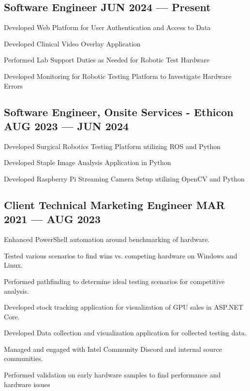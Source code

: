 \subsection{{Software Engineer \hfill JUN 2024 --- Present}}
\begin{zitemize}
\item Developed Web Platform for User Authentication and Access to Data
\item Developed Clinical Video Overlay Application
\item Performed Lab Support Duties as Needed for Robotic Test Hardware
\item Developed Monitoring for Robotic Testing Platform to Investigate Hardware Errors
\end{zitemize}

\subsection{{Software Engineer, Onsite Services - Ethicon \hfill AUG 2023 --- JUN 2024}}
\begin{zitemize}
\item Developed Surgical Robotics Testing Platform utilizing ROS and Python
\item Developed Staple Image Analysis Application in Python
\item Developed Raspberry Pi Streaming Camera Setup utilizing OpenCV and Python
\end{zitemize}

\subsection{{Client Technical Marketing Engineer \hfill MAR 2021 --- AUG 2023}}
\begin{zitemize}
\item Enhanced PowerShell automation around benchmarking of hardware.
\item Tested various scenarios to find wins vs. competing hardware on Windows and Linux.
\item Performed pathfinding to determine ideal testing scenarios for competitive analysis.
\item Developed stock tracking application for visualization of GPU sales in ASP.NET Core.
\item Developed Data collection and visualization application for collected testing data.
\item Managed and engaged with Intel Community Discord and internal source communities.
\item Performed validation on early hardware samples to find performance and hardware issues
\end{zitemize}

